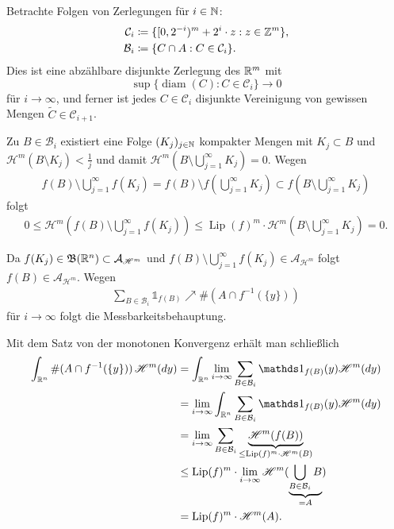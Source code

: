 \documentclass[a4paper,twoside,DIV15,BCOR12mm]{scrbook}
\newcommand{\A}{\mathcal A}
\newcommand{\borel}{\mathfrak B}
\newcommand{\ind}{\mathds 1}
\newcommand{\HM}{\mathscr H}
\DeclareMathOperator{\diam}{diam}
\DeclareMathOperator{\Lip}{Lip}
\begin{document}
\begin{beweis}
Betrachte Folgen von Zerlegungen für $i\in \mathbb{N}$:
\begin{align*}
\mathcal C_i &\da  \{[0,2^{-i})^m + 2^i \cdot z: z \in \MdZ^m\},\\
\mathcal B_i &\da  \{C\cap A : C \in \mathcal C_i\}.
\end{align*}
Dies ist eine abzählbare disjunkte Zerlegung des $\mathbb{R}^m$ mit
\[
\sup\{\diam(C): C\in\mathcal C_i\} \to 0
\]
für $i\to \infty$, und ferner ist jedes $C\in\mathcal C_i$ disjunkte Vereinigung von gewissen Mengen 
$\tilde C\in\mathcal C_{i+1}$.

Zu $B\in\mathcal B_i$ existiert eine Folge $(K_j)_{j\in \mathbb{N}}$ kompakter Mengen mit $K_j \subset B$ und $\HM^m(B\setminus K_j) < \frac 1j$ und damit $\HM^m(B\setminus\bigcup_{j=1}^\infty K_j) = 0$.
Wegen 
\begin{align*}
f(B) \setminus \bigcup_{j=1}^\infty f(K_j) = f(B) \setminus f(\bigcup_{j=1}^\infty K_j) \subset f(B\setminus \bigcup_{j=1}^\infty K_j)
\end{align*}
folgt
\begin{align*}
0 \le \HM^m(f(B) \setminus \bigcup_{j=1}^\infty f(K_j)) \le \Lip(f)^m \cdot \HM^m(B\setminus \bigcup_{j=1}^\infty K_j) = 0.
\end{align*}

Da $f(K_j) \in \borel(\MdR^n) \subset \A_{\HM^m}$ und $f(B)\setminus \bigcup_{j=1}^\infty f(K_j) \in \A_{\HM^m}$ folgt $f(B) \in \A_{\HM^m}$. Wegen
\begin{align*}
\sum_{B\in\mathcal B_i} \ind_{f(B)} \nearrow \#(A\cap f^{-1}(\{y\}))
\end{align*}
für $i\to \infty$  folgt die Messbarkeitsbehauptung.

Mit dem Satz von der monotonen Konvergenz erhält man schließlich
\begin{align*}
\int_{\MdR^n} \#(A \cap f^{-1}(\{y\}) )\, \HM^m(dy) 
&= \int_{\MdR^n} \lim_{i\to\infty} \sum_{B\in\mathcal B_i} \ind_{f(B)}(y) \HM^m(dy) \\
&= \lim_{i\to\infty} \int_{\MdR^n}\sum_{B\in\mathcal B_i}\ind_{f(B)}(y) \HM^m(dy) \\
&= \lim_{i\to\infty} \sum_{B\in\mathcal B_i} \underbrace{\HM^m(f(B))}_{\le \Lip(f)^m\cdot \HM^m(B)}\\
&\le \Lip(f)^m \cdot \lim_{i\to\infty} \HM^m(\underbrace{\bigcup_{B\in\mathcal B_i} B}_{=A}) \\
&=   \Lip(f)^m \cdot \HM^m(A).
\end{align*}
\end{beweis}
\end{document}
